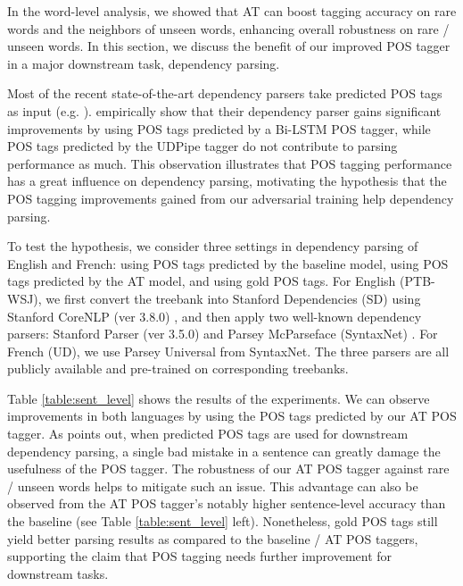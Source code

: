 \documentclass[11pt,a4paper]{article}
\begin{document}
In the word-level analysis, we showed that %
AT can boost tagging accuracy on rare words and the neighbors of unseen words, enhancing overall robustness on rare \!/\! unseen words. 
In this section, we discuss the benefit of our improved POS tagger in a major downstream task, dependency parsing.

Most of the recent state-of-the-art dependency parsers take predicted POS tags as input (e.g. ).
 empirically show that their
dependency parser gains significant improvements by using POS tags predicted by a Bi-LSTM POS tagger, while POS tags predicted by the UDPipe tagger \cite{Straka2016UDPipeTP} do not contribute to parsing performance as much.
This observation illustrates that POS tagging performance has a great influence on dependency parsing, motivating the hypothesis that the POS tagging improvements gained from our adversarial training help dependency parsing.

To test the hypothesis, we consider three settings in dependency parsing of English and French: using POS tags predicted by the baseline model, using POS tags predicted by the AT model, and using gold POS tags. 
For English (PTB-WSJ), we first convert the treebank into Stanford Dependencies (SD) using Stanford CoreNLP (ver 3.8.0) \cite{manning-EtAl:2014:P14-5}, and then apply two well-known dependency parsers:
Stanford Parser (ver 3.5.0) \cite{chen2014fast} and Parsey McParseface (SyntaxNet) \cite{andor2016globally}.
For French (UD),
we use Parsey Universal from SyntaxNet.
The three parsers are all publicly available and pre-trained on corresponding treebanks.

Table \ref{table:sent_level} shows the results of the experiments. We can observe improvements in both languages by using the POS tags predicted by our AT POS tagger. 
As  points out, when predicted POS tags are used for downstream dependency parsing, a single bad mistake in a sentence can greatly damage the usefulness of the POS tagger.
The robustness of our AT POS tagger against rare \!/\! unseen words %
helps to mitigate such an issue.
This advantage can also be observed from the AT POS tagger's notably higher sentence-level accuracy than the baseline (see Table \ref{table:sent_level} left).
Nonetheless, gold POS tags still yield better parsing results as compared to the baseline \!/\! AT POS taggers, supporting the claim that POS tagging needs further improvement for downstream tasks.
\end{document}
